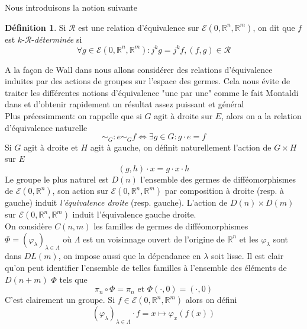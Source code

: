 \documentclass[a4paper,12pt,oneside,titlepage]{article}
\newcommand{\R}[0]{\mathbb{R}}
\theoremstyle{definition}
\newtheorem{definition}{Définition}[section]
\theoremstyle{plain}
\begin{document}
Nous introduisons la notion suivante
\begin{definition}
    Si $\mathcal{R}$ est une relation 
    d'équivalence sur $\mathcal{E}(0,\R^n,\R^m)$, on dit que $f$ est $k$-$\mathcal{R}$-\textit{déterminée} si 
    \begin{equation*}
        \forall g\in \mathcal{E}(0,\R^n,\R^m): j^k g=j^k f, (f,g)\in\mathcal{R}
    \end{equation*}
\end{definition}
A la façon de Wall dans \cite{Wall1981FiniteDeterminacy} nous allons considérer des relations d'équivalence induites par des actions de groupes sur l'espace des germes. Cela nous évite de traiter les différentes notions d'équivalence "une par une" comme le fait Montaldi dans \cite{montaldi2021sbc} et d'obtenir rapidement un résultat assez puissant et général\\
 Plus précesimment:  on rappelle que si $G$ agit à droite sur $E$, alors on a la relation d'équivalence naturelle 
 \begin{equation*}
    \sim_G : e \sim_Gf \Leftrightarrow \exists g\in G : g\cdot e=f
 \end{equation*}
 Si $G$ agit à droite et $H$ agit à gauche, on définit naturellement l'action de $G\times H$ sur $E$
 \begin{equation*}
    (g,h)\cdot x = g\cdot x \cdot h
 \end{equation*}
Le groupe le plus naturel est $D(n)$ l'ensemble des germes de difféomorphismes de $\mathcal{E}(0,\R^n)$, son action sur $\mathcal{E}(0,\R^n,\R^m)$  par composition à droite (resp. à gauche) induit \textit{l'équivalence droite} (resp. gauche). L'action de $D(n)\times D(m)$ sur $\mathcal{E}(0,\R^n,\R^m)$ induit l'équivalence gauche droite.\\
On considère  $C(n,m)$  les familles de germes de difféomorphismes  $\Phi=(\varphi_{\lambda})_{\lambda\in\Lambda}$ où $\Lambda$ est un voisinnage ouvert de l'origine de $\R^n$ et les $\varphi_{\lambda}$ sont dans $DL(m)$, on impose aussi que la dépendance en $\lambda$ soit lisse. Il est clair qu'on peut identifier l'ensemble de telles familles à l'ensemble des éléments de $D(n+m)$ $\Phi$ tels que
\begin{equation*}
    \pi_n \circ \Phi=\pi_n\text{ et } \Phi(\cdot, 0)= (\cdot, 0)
\end{equation*}
C'est clairement un groupe.
Si $f\in\mathcal{E}(0,\R^n,\R^m)$ alors on défini
\begin{equation*}
    (\varphi_{\lambda})_{\lambda\in\Lambda}\cdot f= x\mapsto \varphi_x(f(x))
\end{equation*}
\end{document}
